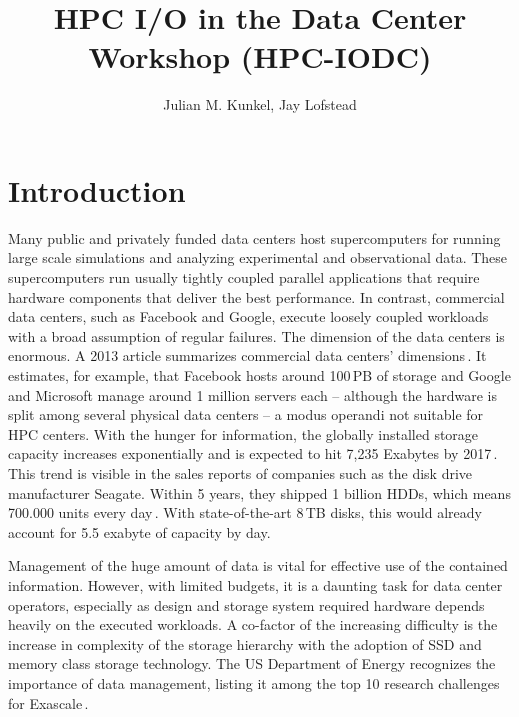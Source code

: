 \documentclass{llncs}
\begin{document}
\mainmatter


\author{Julian M. Kunkel, Jay Lofstead
}

\title{HPC I/O in the Data Center Workshop (HPC-IODC)}


\maketitle{}

\section{Introduction}
\label{sec:intro}

Many public and privately funded data centers host supercomputers for running large scale simulations and analyzing experimental and observational data.
These supercomputers run usually tightly coupled parallel applications that require hardware components that deliver the best performance.
In contrast, commercial data centers, such as Facebook and Google, execute loosely coupled workloads with a broad assumption of regular failures.
The dimension of the data centers is enormous.
A 2013 article summarizes commercial data centers' dimensions\,\cite{data13}.
It estimates, for example, that Facebook hosts around 100\,PB of storage and Google and Microsoft manage around 1 million servers each -- although the hardware is split among several physical data centers -- a modus operandi not suitable for HPC centers.
With the hunger for information, the globally installed storage capacity increases exponentially and is expected to hit 7,235 Exabytes by 2017\,\cite{EXA13}.
This trend is visible in the sales reports of companies such as the disk drive manufacturer Seagate. Within 5 years, they shipped 1 billion HDDs, which means 700.000 units every day\,\cite{SG14}.
With state-of-the-art 8\,TB disks, this would already account for 5.5 exabyte of capacity by day.

Management of the huge amount of data is vital for effective use of the contained information. However, with limited budgets, it is a daunting task for data center operators,
especially as design and storage system required hardware depends heavily on the executed workloads.
A co-factor of the increasing difficulty is the increase in complexity of the storage hierarchy with the adoption of SSD and memory class storage technology.
The US Department of Energy recognizes the importance of data management, listing it among the top 10 research challenges for Exascale\,\cite{top14}. %
\end{document}
